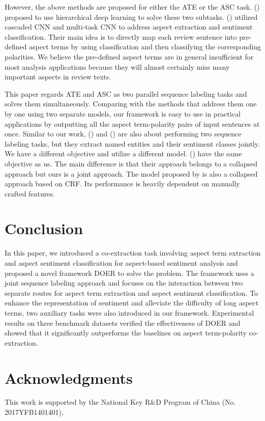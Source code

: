 \documentclass[11pt,a4paper]{article}
\begin{document}
	However, the above methods are proposed for either the ATE or the ASC task.	\citeauthor{Lakkaraju2014Aspect} (\citeyear{Lakkaraju2014Aspect}) proposed to use hierarchical deep learning to solve these two subtasks. \citeauthor{Wu2016} (\citeyear{Wu2016}) utilized cascaded CNN and multi-task CNN to address aspect extraction and sentiment classification. Their main idea is to directly map each review sentence into pre-defined aspect terms by using classification and then classifying the corresponding polarities. We believe the pre-defined aspect terms are in general insufficient for most analysis applications because they will almost certainly miss many important aspects in review texts.
	
	This paper regards ATE and ASC as two parallel sequence labeling tasks and solves them simultaneously. Comparing with the methods that address them one by one using two separate models, our framework is easy to use in practical applications by outputting all the aspect term-polarity pairs of input sentences at once. Similar to our work, \citeauthor{Mitchell2013} (\citeyear{Mitchell2013}) and \citeauthor{Zhang2015} (\citeyear{Zhang2015}) are also about performing two sequence labeling tasks, but they extract named entities and their sentiment classes jointly. We have a different objective and utilize a different model. \citeauthor{Li2019} (\citeyear{Li2019}) have the same objective as us. The main difference is that their approach belongs to a collapsed approach but ours is a joint approach. The model proposed by \cite{Li2017} is also a collapsed approach based on CRF. Its performance is heavily dependent on manually crafted features.
	
\section{Conclusion}
	In this paper, we introduced a co-extraction task involving aspect term extraction and aspect sentiment classification for aspect-based sentiment analysis and proposed a novel framework DOER to solve the problem. The framework uses a joint sequence labeling approach and focuses on the interaction between two separate routes for aspect term extraction and aspect sentiment classification. To enhance the representation of sentiment and alleviate the difficulty of long aspect terms, two auxiliary tasks were also introduced in our framework. Experimental results on three benchmark datasets verified the effectiveness of DOER and showed that it significantly outperforms the baselines on aspect term-polarity co-extraction. 

	\section*{Acknowledgments}
	This work is supported by the National Key R\&D Program of China (No. 2017YFB1401401).



	
	
\end{document}

